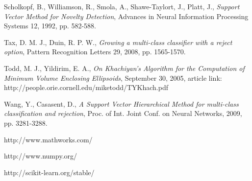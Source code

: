 \documentclass{llncs}
\begin{document}
\begin{thebibliography}{19}
Scholkopf, B., Williamson, R., Smola, A., Shawe-Taylort, J., Platt, J., \emph{Support Vector Method for Novelty Detection}, Advances in Neural Information Processing Systems 12, 1992, pp. 582-588. 

Tax, D. M. J., Duin, R. P. W., \emph{Growing a multi-class classifier with a reject option}, Pattern Recognition Letters 29, 2008, pp. 1565-1570.

Todd, M. J., Yildirim, E. A., \emph{On Khachiyan's Algorithm for the Computation of Minimum Volume Enclosing Ellipsoids}, September 30, 2005, article link: http://people.orie.cornell.edu/miketodd/TYKhach.pdf

Wang, Y., Casasent, D., \emph{A Support Vector Hierarchical Method for multi-class classification and rejection}, Proc. of Int. Joint Conf. on Neural Networks, 2009, pp. 3281-3288.

http://www.mathworks.com/

http://www.numpy.org/

http://scikit-learn.org/stable/

	

 
\end{thebibliography}
\end{document}
